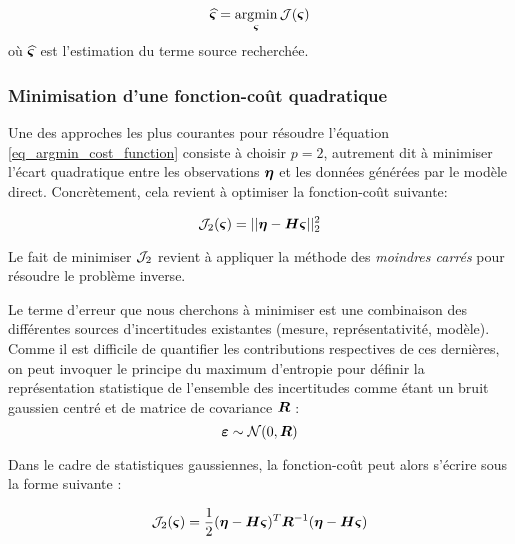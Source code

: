\begin{equation}
\widehat{{\bm{\varsigma}}} = \operatorname*{\arg\!\min}_{\bm{\varsigma}} \mathcal{J}({\bm{\varsigma}})
\label{eq_argmin_cost_function}
\end{equation}
où $\widehat{{\bm{\varsigma}}}$ est l'estimation du terme source recherchée.

\subsubsection{Minimisation d'une fonction-coût quadratique}

Une des approches les plus courantes pour résoudre l'équation \eqref{eq_argmin_cost_function} consiste à choisir $p=2$, autrement dit à minimiser l'écart quadratique entre les observations ${\bm{\eta}}$ et les données générées par le modèle direct. Concrètement, cela revient à optimiser la fonction-coût suivante:

\begin{equation}
{\mathcal{J}}_{2}({\bm{\varsigma}}) = ||{\bm{\eta}} - {\bm{H}} {\bm{\varsigma}} ||_2^2
\label{eq_cost_MCO}
\end{equation}

Le fait de minimiser ${\mathcal{J}}_2$ revient à appliquer la méthode des \textit{moindres carrés} pour résoudre le problème inverse. 

Le terme d'erreur que nous cherchons à minimiser est une combinaison des différentes sources d'incertitudes existantes (mesure, représentativité, modèle). Comme il est difficile de quantifier les contributions respectives de ces dernières, on peut invoquer le principe du maximum d'entropie pour définir la représentation statistique de l'ensemble des incertitudes comme étant un bruit gaussien centré et de matrice de covariance ${\bm{R}}$ : 
\begin{equation}
{\bm{\varepsilon}} \sim \mathcal{N}(0,{\bm{R}})
\label{eq_bruit_obs}
\end{equation}

Dans le cadre de statistiques gaussiennes, la fonction-coût peut alors s'écrire sous la forme suivante \cite{Winiarek2011}:

\begin{equation}
\mathcal{J}_2({\bm{\varsigma}}) = \dfrac{1}{2}({\bm{\eta}} - {\bm{H}} {\bm{\varsigma}})^T {\bm{R}}^{-1}({\bm{\eta}} - {\bm{H}}{\bm{\varsigma}})
\label{eq_cost_forme2}
\end{equation}

